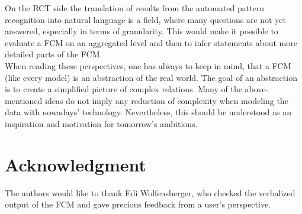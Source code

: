 \documentclass[conference]{IEEEtran}
\begin{document}
On the RCT side the translation of results from the automated pattern recognition into natural language is a field, where many questions are not yet answered, especially in terms of granularity. This would make it possible to evaluate a FCM on an aggregated level and then to infer statements about more detailed parts of the FCM.\\
When reading these perspectives, one has always to keep in mind, that a FCM (like every model) is an abstraction of the real world. The goal of an abstraction is to create a simplified picture of complex relations. Many of the above-mentioned ideas do not imply any reduction of complexity when modeling the data with nowadays' technology. Nevertheless, this should be understood as an inspiration and motivation for tomorrow's ambitions.

\section*{Acknowledgment}
The authors would like to thank Edi Wolfensberger, who checked the verbalized output of the FCM and gave precious feedback from a user's perspective.



\end{document}
